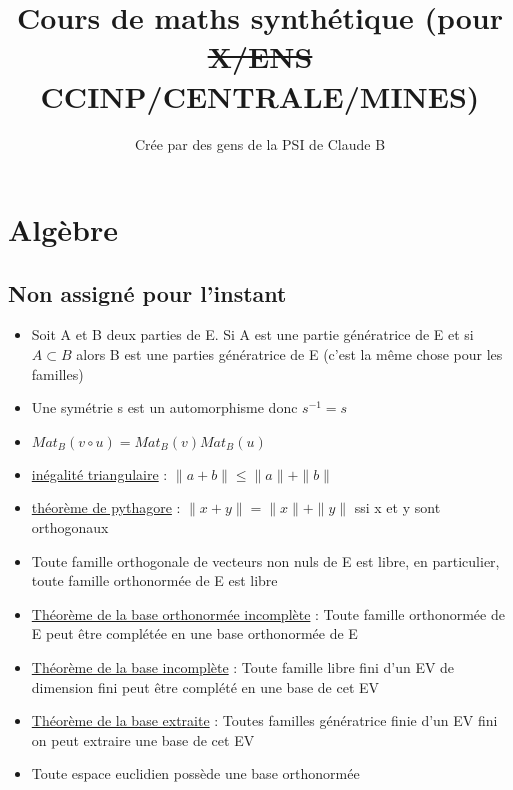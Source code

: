 \documentclass{article}
\title{Cours de maths synthétique (pour \sout{X/ENS} CCINP/CENTRALE/MINES)}
\author{Crée par des gens de la PSI de Claude B}
\begin{document}
\maketitle

\newpage

\section{Algèbre}

\subsection{Non assigné pour l'instant}
\begin{itemize}[label=$\ast$]
	\item Soit A et B deux parties de E. Si A est une partie génératrice de E et si \( A \subset B \) alors B est une parties génératrice de E (c'est la même chose pour les familles)
	\item Une symétrie s est un automorphisme donc \(s^{-1} = s \)
	\item 	\( Mat_B(v \circ u) = Mat_B(v)Mat_B(u) \)
	\item \underline{inégalité triangulaire} : \( \|a + b\| \leq \|a\| + \|b\| \)
	\item \underline{théorème de pythagore} : \( \|x + y\| = \|x\| + \|y\| \) ssi x et y sont orthogonaux
	\item Toute famille orthogonale de vecteurs non nuls de E est libre, en particulier, toute famille orthonormée de E est libre
	\item \underline{Théorème de la base orthonormée incomplète} : Toute famille orthonormée de E peut être complétée en une base orthonormée de E
	\item \underline{Théorème de la base incomplète} : Toute famille libre fini d'un EV de dimension fini peut être complété en une base de cet EV
	\item \underline{Théorème de la base extraite} : Toutes familles génératrice finie d'un EV fini on peut extraire une base de cet EV
	\item Toute espace euclidien possède une base orthonormée
\end{itemize}
\end{document}
